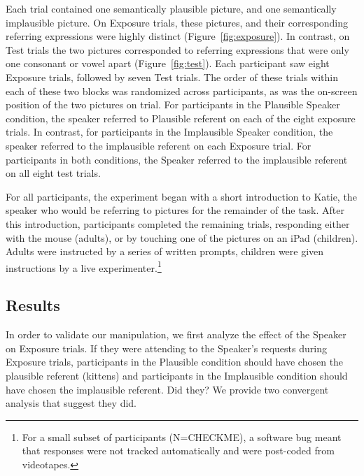 \documentclass[man,floatsintext]{apa6}
\begin{document}
Each trial contained one semantically plausible picture, and one semantically implausible picture. On Exposure trials, these pictures, and their corresponding referring expressions were highly distinct (Figure~\ref{fig:exposure}). In contrast, on Test trials the two pictures corresponded to referring expressions that were only one consonant or vowel apart (Figure~\ref{fig:test}). Each participant saw eight Exposure trials, followed by seven Test trials. The order of these trials within each of these two blocks was randomized across participants, as was the on-screen position of the two pictures on trial. For participants in the Plausible Speaker condition, the speaker referred to Plausible referent on each of the eight exposure trials. In contrast, for participants in the Implausible Speaker condition, the speaker referred to the implausible referent on each Exposure trial. For participants in both conditions, the Speaker referred to the implausible referent on all eight test trials.

For all participants, the experiment began with a short introduction to Katie, the speaker who would be referring to pictures for the remainder of the task. After this introduction, participants completed the remaining trials, responding either with the mouse (adults), or by touching one of the pictures on an iPad (children). Adults were instructed by a series of written prompts, children were given instructions by a live experimenter.\footnote{For a small subset of participants (N=CHECKME), a software bug meant that responses were not tracked automatically and were post-coded from videotapes.}

\subsection{Results}

In order to validate our manipulation, we first analyze the effect of the Speaker on Exposure trials. If they were attending to the Speaker's requests during Exposure trials, participants in the Plausible condition should have chosen the plausible referent (kittens) and participants in the Implausible condition should have chosen the implausible referent. Did they? We provide two convergent analysis that suggest they did. 
\end{document}

